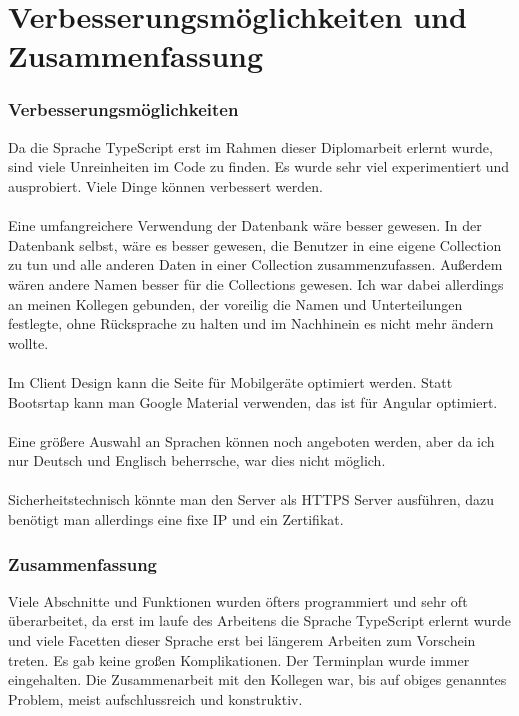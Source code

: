 \section{Verbesserungsmöglichkeiten und Zusammenfassung}
\label{sec:verbesserung-und-zusammenfassung}

\subsubsection{Verbesserungsmöglichkeiten}
\label{sec:verbesserung}
Da die Sprache TypeScript erst im Rahmen dieser Diplomarbeit erlernt wurde, sind viele Unreinheiten im Code zu finden. Es wurde sehr viel experimentiert und ausprobiert. Viele Dinge können verbessert werden. \\ \\
Eine umfangreichere Verwendung der Datenbank wäre besser gewesen. In der Datenbank selbst, wäre es besser gewesen, die Benutzer in eine eigene Collection zu tun und alle anderen Daten in einer Collection zusammenzufassen. Außerdem wären andere Namen besser für die Collections gewesen. Ich war dabei allerdings an meinen Kollegen gebunden, der voreilig die Namen und Unterteilungen festlegte, ohne Rücksprache zu halten und im Nachhinein es nicht mehr ändern wollte. \\ \\
Im Client Design kann die Seite für Mobilgeräte optimiert werden. Statt Bootsrtap kann man Google Material verwenden, das ist für Angular optimiert. \\ \\
Eine größere Auswahl an Sprachen können noch angeboten werden, aber da ich nur Deutsch und Englisch beherrsche, war dies nicht möglich. \\ \\
Sicherheitstechnisch könnte man den Server als \ac{HTTPS} Server ausführen, dazu benötigt man allerdings eine fixe IP und ein Zertifikat.

\subsubsection{Zusammenfassung}
\label{sec:zusammenfassung}
Viele Abschnitte und Funktionen wurden öfters programmiert und sehr oft überarbeitet, da erst im laufe des Arbeitens die Sprache TypeScript erlernt wurde und viele Facetten dieser Sprache erst bei längerem Arbeiten zum Vorschein treten. Es gab keine großen Komplikationen. Der Terminplan wurde immer eingehalten. Die Zusammenarbeit mit den Kollegen war, bis auf obiges genanntes Problem, meist aufschlussreich und konstruktiv.